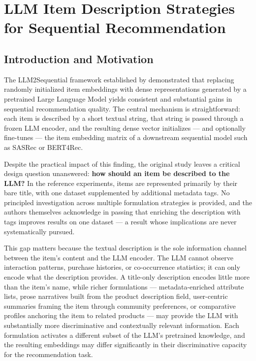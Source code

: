 \documentclass[12pt,a4paper]{report}
\newcommand{\textcite}[1]{\citet{#1}}
\begin{document}
\chapter{LLM Item Description Strategies for Sequential Recommendation}
\label{ch:promptcraft}

\section{Introduction and Motivation}

The LLM2Sequential framework established by \textcite{boz2025improving}
demonstrated that replacing randomly initialized item embeddings with
dense representations generated by a pretrained Large Language Model
yields consistent and substantial gains in sequential recommendation
quality. The central mechanism is straightforward: each item is
described by a short textual string, that string is passed through
a frozen LLM encoder, and the resulting dense vector initializes
--- and optionally fine-tunes --- the item embedding matrix of a
downstream sequential model such as SASRec or BERT4Rec.

Despite the practical impact of this finding, the original study
leaves a critical design question unanswered: \textbf{how should
an item be described to the LLM?} In the reference experiments,
items are represented primarily by their bare title, with one dataset
supplemented by additional metadata tags. No principled investigation
across multiple formulation strategies is provided, and the authors
themselves acknowledge in passing that enriching the description
with tags improves results on one dataset --- a result whose
implications are never systematically pursued.

This gap matters because the textual description is the sole
information channel between the item's content and the LLM encoder.
The LLM cannot observe interaction patterns, purchase histories, or
co-occurrence statistics; it can only encode what the description
provides. A title-only description encodes little more than the item's
name, while richer formulations --- metadata-enriched attribute lists,
prose narratives built from the product description field,
user-centric summaries framing the item through community preferences,
or comparative profiles anchoring the item to related products ---
may provide the LLM with substantially more discriminative and
contextually relevant information. Each formulation activates a
different subset of the LLM's pretrained knowledge, and the resulting
embeddings may differ significantly in their discriminative capacity
for the recommendation task.
\end{document}
